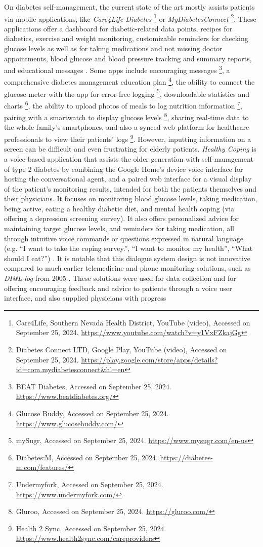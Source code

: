 On diabetes self-management, the current state of the art mostly assists patients via mobile applications, like \textit{Care4Life Diabetes} \footnote{Care4Life, Southern Nevada Health District, YouTube (video), Accessed on September 25, 2024. \url{https://www.youtube.com/watch?v=y1VxFZkajGg}} or \textit{MyDiabetesConnect} \footnote{Diabetes Connect LTD, Google Play, YouTube (video), Accessed on September 25, 2024. \url{https://play.google.com/store/apps/details?id=com.mydiabetesconnect&hl=en}}. These applications offer a dashboard for diabetic-related data points, recipes for diabetics, exercise and weight monitoring, customizable reminders for checking glucose levels as well as for taking medications and not missing doctor appointments, blood glucose and blood pressure tracking and summary reports, and educational messages \cite{care4life2021}. Some apps include encouraging messages \footnote{BEAT Diabetes, Accessed on September 25, 2024. \url{https://www.beatdiabetes.org/}}, a comprehensive diabetes management education plan \footnote{Glucose Buddy, Accessed on September 25, 2024. \url{https://www.glucosebuddy.com/}}, the ability to connect the glucose meter with the app for error-free logging \footnote{mySugr, Accessed on September 25, 2024. \url{https://www.mysugr.com/en-us}}, downloadable statistics and charts  \footnote{Diabetes:M, Accessed on September 25, 2024. \url{https://diabetes-m.com/features/}}, the ability to upload photos of meals to log nutrition information \footnote{Undermyfork, Accessed on September 25, 2024. \url{https://www.undermyfork.com/}}, pairing with a smartwatch to display glucose levels \footnote{Gluroo, Accessed on September 25, 2024. \url{https://gluroo.com/}}, sharing real-time data to the whole family's smartphones, and also a synced web platform for healthcare professionals to view their patients' logs \footnote{Health 2 Sync, Accessed on September 25, 2024. \url{https://www.health2sync.com/careproviders}}. However, inputting information on a screen can be difficult and even frustrating for elderly patients. \textit{Healthy Coping} is a voice-based application that assists the older generation with self-management of type 2 diabetes by combining the Google Home's device voice interface for hosting the conversational agent, and a paired web interface for a visual display of the patient's monitoring results, intended for both the patients themselves and their physicians. It focuses on monitoring blood glucose levels, taking medication, being active, eating a healthy diabetic diet, and mental health coping (via offering a depression screening survey). It also offers personalized advice for maintaining target glucose levels, and reminders for taking medication, all through intuitive voice commands or questions expressed in natural language (e.g. “I want to take the coping survey.”, “I want to monitor my health”, “What should I eat?”) \cite{GoogleHomediabetes2018}. It is notable that this dialogue system design is not innovative compared to much earlier telemedicine and phone monitoring solutions, such as \textit{DI@L-log} from 2005 \cite{18thIEEESymposium2005}. These solutions were used for data collection and for offering encouraging feedback and advice to patients through a voice user interface, and also supplied physicians with progress 